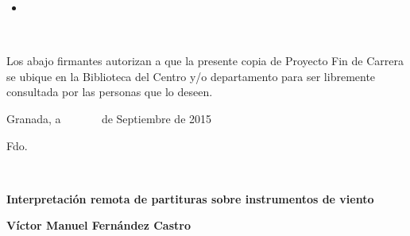 \begin{itemize}
	\item [] 
\end{itemize}


\newpage


\newpage
\thispagestyle{empty}

\cleardoublepage
\thispagestyle{empty}
{}



\newpage
\thispagestyle{empty}
\noindent

\newpage
\thispagestyle{empty}

~

\cleardoublepage
{}
\thispagestyle{empty}


\noindent Los abajo firmantes autorizan a que la presente copia de
Proyecto Fin de Carrera se ubique en la Biblioteca del Centro y/o
departamento para ser libremente consultada por las personas que lo
deseen.

\vspace*{1cm}

\begin{center}
Granada, a ~~~~~~ de Septiembre de 2015
\par\end{center}

\bigskip%
\bigskip%
\begin{doublespace}
\hspace{4cm}Fdo.
\end{doublespace}

\newpage
\thispagestyle{empty}

~

\cleardoublepage
{}
\thispagestyle{empty}

\begin{center}
\textbf{\Large Interpretación remota de partituras sobre instrumentos de viento}
\par\end{center}{\Large \par}

\begin{center}
\textbf{\large Víctor Manuel Fernández Castro}
\par\end{center}{\large \par}

